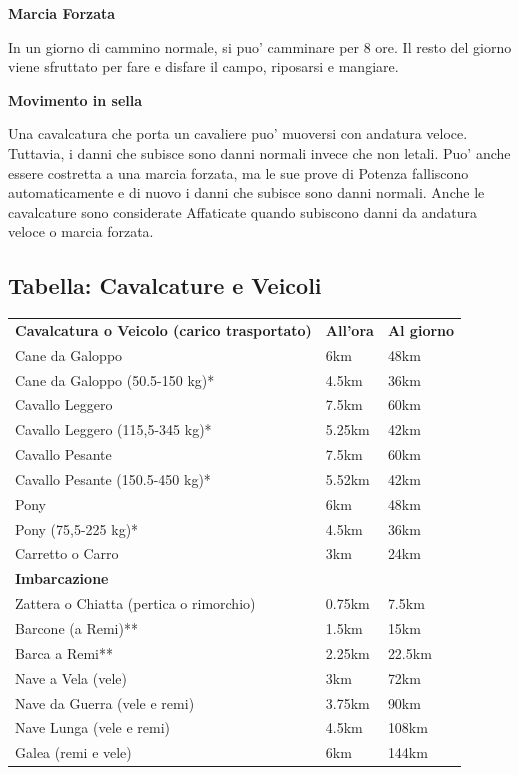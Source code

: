\documentclass[a4paper,11pt,twoside,openany]{book}
\begin{document}
{		\bigskip
		
		\textbf{Marcia Forzata}
		
		In un giorno di cammino normale, si puo' camminare per 8 ore. Il resto del giorno viene sfruttato per fare e disfare il campo, riposarsi e mangiare.
		
		\textbf{Movimento in sella}
		
		Una cavalcatura che porta un cavaliere puo' muoversi con andatura veloce. Tuttavia, i danni che subisce sono danni normali invece che non letali. Puo' anche essere costretta a una marcia forzata, ma le sue prove di Potenza falliscono automaticamente e di nuovo i danni che subisce sono danni normali. Anche le cavalcature sono considerate Affaticate quando subiscono danni da andatura veloce o marcia forzata.
		
		\subsection{Tabella: Cavalcature e Veicoli}
		
		\medskip
		
		\label{tabella-cavalcature-e-veicoli}
		
		\begin{tabular}{lll}
			\toprule
			\textbf{Cavalcatura o Veicolo (carico trasportato)} & \textbf{All'ora} & \textbf{Al giorno}\tabularnewline
			Cane da Galoppo &6km &48km\\
			Cane da Galoppo (50.5-150 kg)* &4.5km& 36km\\
			Cavallo Leggero& 7.5km &60km\\
			Cavallo Leggero (115,5-345 kg)* &5.25km &42km\\
			Cavallo Pesante &7.5km &60km\\
			Cavallo Pesante (150.5-450 kg)* &5.52km& 42km\\
			Pony &6km &48km\\
			Pony (75,5-225 kg)* &4.5km &36km\\
			Carretto o Carro &3km &24km\\
			\textbf{Imbarcazione} &&\\
			Zattera o Chiatta (pertica o rimorchio) & 0.75km &7.5km\\
			Barcone (a Remi)** &1.5km &15km\\
			Barca a Remi** &2.25km& 22.5km\\
			Nave a Vela (vele) &3km &72km\\
			Nave da Guerra (vele e remi) &3.75km& 90km\\
			Nave Lunga (vele e remi) &4.5km& 108km\\
			Galea (remi e vele) &6km& 144km\\
		\end{tabular}
		
}
\end{document}

